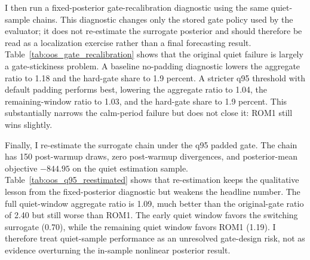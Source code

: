 \documentclass[12pt]{article}
\theoremstyle{plain}
\theoremstyle{definition}
\theoremstyle{remark}
\begin{document}
I then run a fixed-posterior gate-recalibration diagnostic using the same quiet-sample chains. This diagnostic changes only the stored gate policy used by the evaluator; it does not re-estimate the surrogate posterior and should therefore be read as a localization exercise rather than a final forecasting result. Table~\ref{tab:oos_gate_recalibration} shows that the original quiet failure is largely a gate-stickiness problem. A baseline no-padding diagnostic lowers the aggregate ratio to 1.18 and the hard-gate share to 1.9 percent. A stricter q95 threshold with default padding performs best, lowering the aggregate ratio to 1.04, the remaining-window ratio to 1.03, and the hard-gate share to 1.9 percent. This substantially narrows the calm-period failure but does not close it: ROM1 still wins slightly.

Finally, I re-estimate the surrogate chain under the q95 padded gate. The chain has 150 post-warmup draws, zero post-warmup divergences, and posterior-mean objective $-844.95$ on the quiet estimation sample. Table~\ref{tab:oos_q95_reestimated} shows that re-estimation keeps the qualitative lesson from the fixed-posterior diagnostic but weakens the headline number. The full quiet-window aggregate ratio is 1.09, much better than the original-gate ratio of 2.40 but still worse than ROM1. The early quiet window favors the switching surrogate (0.70), while the remaining quiet window favors ROM1 (1.19). I therefore treat quiet-sample performance as an unresolved gate-design risk, not as evidence overturning the in-sample nonlinear posterior result.
\end{document}
